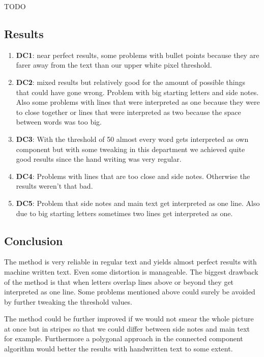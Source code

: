 \documentclass[a4paper, 10pt]{article}
\begin{document}
	\par{TODO}
	
	\subsection{Results}
	
	\begin{enumerate}
		\item \textbf{DC1}: near perfect results, some problems with bullet points because they are farer away from the text than our upper white pixel threshold.
		\item \textbf{DC2}: mixed results but relatively good for the amount of possible things that could have gone wrong. Problem with big starting letters and side notes. Also some problems with lines that were interpreted as one because they were to close together or lines that were interpreted as two because the space between words was too big.
		\item \textbf{DC3}: With the threshold of 50 almost every word gets interpreted as own component but with some tweaking in this department we achieved quite good results since the hand writing was very regular.
		\item \textbf{DC4}: Problems with lines that are too close and side notes. Otherwise the results weren't that bad.
		\item \textbf{DC5}: Problem that side notes and main text get interpreted as one line. Also due to big starting letters sometimes two lines get interpreted as one.
	\end{enumerate}

	\subsection{Conclusion}
	
	\par{The method is very reliable in regular text and yields almost perfect results with machine written text. Even some distortion is manageable. The biggest drawback of the method is that when letters overlap lines above or beyond they get interpreted as one line. Some problems mentioned above could surely be avoided by further tweaking the threshold values.}
	\par{The method could be further improved if we would not smear the whole picture at once but in stripes so that we could differ between side notes and main text for example. Furthermore a polygonal approach in the connected component algorithm would better the results with handwritten text to some extent. }
	
	
\end{document}
